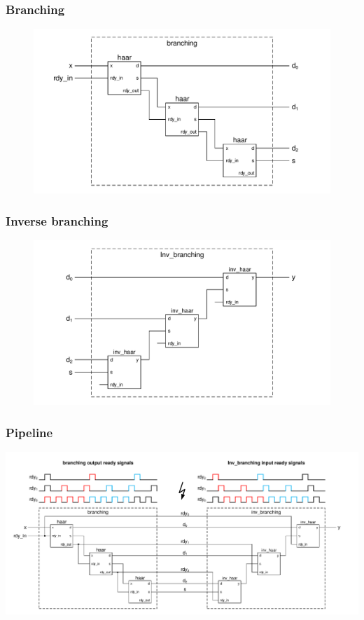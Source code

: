 \documentclass[english, aspectratio=169]{beamer}
\begin{document}
\begin{frame}
\frametitle{Branching}

\begin{figure}
	\includegraphics[scale=0.7]{branching.pdf}
\end{figure}

\end{frame}


\begin{frame}
\frametitle{Inverse branching}

\begin{figure}
	\includegraphics[scale=0.7]{inv_branching.pdf}
\end{figure}

\end{frame}

\begin{frame}
\frametitle{Pipeline}

	\centering
	\includegraphics[scale=0.45]{main.pdf}

\end{frame}
\end{document}
